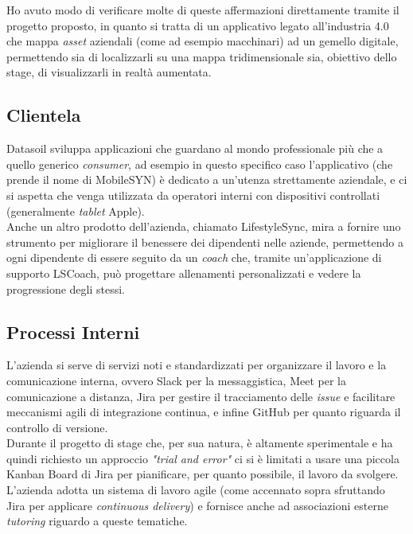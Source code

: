 Ho avuto modo di verificare molte di queste affermazioni direttamente tramite il progetto proposto, in quanto si tratta di un applicativo legato all'industria 4.0 che mappa \textit{asset} aziendali (come ad esempio macchinari) ad un gemello digitale, permettendo sia di localizzarli su una mappa tridimensionale sia, obiettivo dello stage, di visualizzarli in realtà aumentata.\\

\subsection{Clientela}
Datasoil sviluppa applicazioni che guardano al mondo professionale più che a quello generico \textit{consumer}, ad esempio in questo specifico caso l'applicativo (che prende il nome di MobileSYN) è dedicato a un'utenza strettamente aziendale, e ci si aspetta che venga utilizzata da operatori interni con dispositivi controllati (generalmente \textit{tablet} Apple). \\
Anche un altro prodotto dell'azienda, chiamato LifestyleSync, mira a fornire uno strumento per migliorare il benessere dei dipendenti nelle aziende, permettendo a ogni dipendente di essere seguito da un \textit{coach} che, tramite un'applicazione di supporto LSCoach, può progettare allenamenti personalizzati e vedere la progressione degli stessi.

\subsection{Processi Interni}
L'azienda si serve di servizi noti e standardizzati per organizzare il lavoro e la comunicazione interna, ovvero Slack per la messaggistica, Meet per la comunicazione a distanza, Jira per gestire il tracciamento delle \textit{issue} e facilitare meccanismi agili di integrazione continua, e infine GitHub per quanto riguarda il controllo di versione.\\
Durante il progetto di stage che, per sua natura, è altamente sperimentale e ha quindi richiesto un approccio \textit{"trial and error"} ci si è limitati a usare una piccola Kanban Board di Jira per pianificare, per quanto possibile, il lavoro da svolgere.\\
L'azienda adotta un sistema di lavoro agile (come accennato sopra sfruttando Jira per applicare \textit{continuous delivery}) e fornisce anche ad associazioni esterne \textit{tutoring} riguardo a queste tematiche. 

